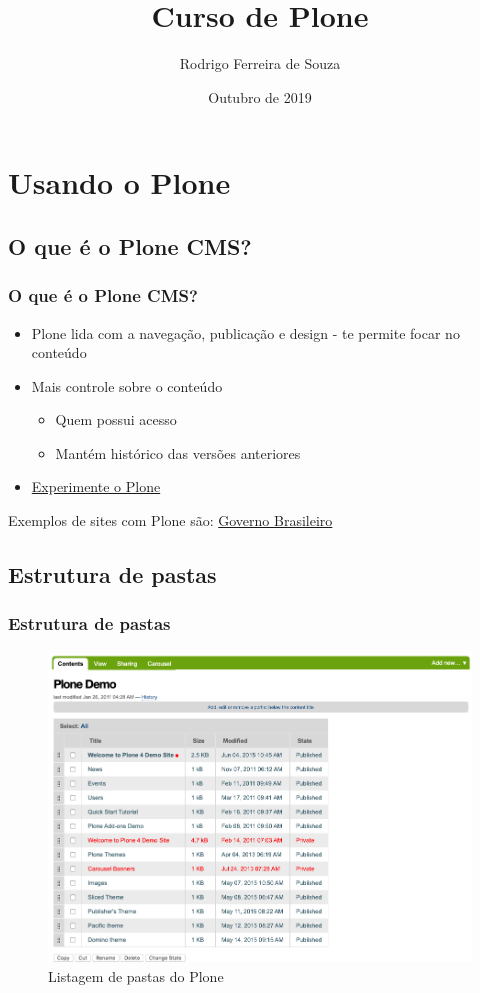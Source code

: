 \documentclass{beamer}
\title{Curso de Plone}
\author{Rodrigo Ferreira de Souza}
\date{Outubro de 2019}
\begin{document}
\maketitle


\section{Usando o Plone}
\subsection{O que é o Plone CMS?}
\begin{frame}
    \frametitle{O que é o Plone CMS?}
    \begin{itemize}
        \item Plone lida com a navegação, publicação e design - te permite focar no conteúdo
        \item Mais controle sobre o conteúdo
        \begin{itemize}
            \item Quem possui acesso
            \item Mantém histórico das versões anteriores
        \end{itemize}
        \item \href{https://plone.com/try-plone.html}{Experimente o Plone}
    \end{itemize}

    Exemplos de sites com Plone são:
    \newline
    \href{https://www.gov.br}{Governo Brasileiro}
\end{frame}

\subsection{Estrutura de pastas}
\begin{frame}
    \frametitle{Estrutura de pastas}
    \begin{figure}
        \includegraphics[width=.7\textwidth]{./img/001-001_-_folder.png}
        \caption{Listagem de pastas do Plone}
    \end{figure}
\end{frame}
\end{document}
